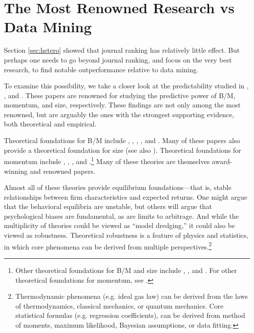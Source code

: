 
\section{The Most Renowned Research vs Data Mining}\label{sec:app-most-famous}

Section \ref{sec:hetero} showed that journal ranking has relatively little effect. But perhaps one needs to go beyond journal ranking, and focus on the very best research, to find notable outperformance relative to data mining.

To examine this possibility, we take a closer look at the predictability studied in \citet{fama1992cross}, \citet{jegadeesh1993returns}, and \citet{banz1981relationship}. These papers are renowned for studying the predictive power of B/M, momentum, and size, respectively. These findings are not only among the most renowned, but are arguably the ones with the strongest supporting evidence, both theoretical and empirical.  

Theoretical foundations for B/M include \citet{berk1999optimal}, \citet{gomes2003equilibrium}, \citet{campbell2004bad}, \citet{zhang2005value}, and \citet{lettau2007long}. Many of these papers also provide a theoretical foundation for size (see also \citealt{berk1995critique}). Theoretical foundations for momentum include \citet{hong1999unified}, \citet{brav2002competing}, \citet{holden2002news}, and \citet{da2014frog}.\footnote{%
Other theoretical foundations for B/M and size include \citet{gabaix2008variable}, \citet{papanikolaou2011investment}, and \citet{chen2018general}. For other theoretical foundations for momentum, see \citealt{subrahmanyam2018equity}.
} %
Many of these theories are themselves award-winning and renowned papers.

Almost all of these theories provide equilibrium foundations---that is, stable relationships between firm characteristics and expected returns. One might argue that the behavioral equilibria are unstable, but others will argue that psychological biases are fundamental, as are limits to arbitrage. And while the multiplicity of theories could be viewed as ``model dredging,'' it could also be viewed as robustness. Theoretical robustness is a feature of physics and statistics, in which core phenomena can be derived from multiple perspectives.\footnote{%
Thermodynamic phenomena (e.g. ideal gas law) can be derived from the laws of thermodynamics,  classical mechanics, or quantum mechanics. Core statistical formulas (e.g. regression coefficients), can be derived from method of moments, maximum likelihood, Bayesian assumptions, or data fitting. 
} %

